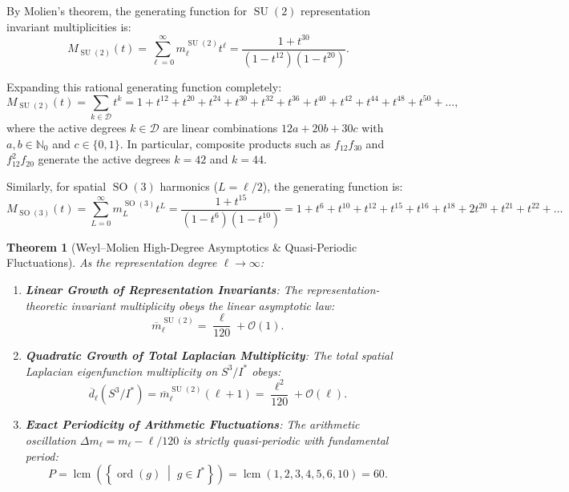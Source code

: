 \documentclass[11pt,a4paper]{article}
\newtheorem{theorem}{Theorem}[section]
\theoremstyle{definition}
\DeclareMathOperator{\lcm}{lcm}
\DeclareMathOperator{\ord}{ord}
\DeclareMathOperator{\SU}{SU}
\DeclareMathOperator{\SO}{SO}
\begin{document}
By Molien's theorem, the generating function for $\SU(2)$ representation invariant multiplicities is:
\begin{equation}
M_{\SU(2)}(t) = \sum_{\ell=0}^\infty m_\ell^{\SU(2)} t^\ell = \frac{1 + t^{30}}{(1 - t^{12})(1 - t^{20})}.
\end{equation}

Expanding this rational generating function completely:
\begin{equation}
M_{\SU(2)}(t) = \sum_{k \in \mathcal{D}} t^k = 1 + t^{12} + t^{20} + t^{24} + t^{30} + t^{32} + t^{36} + t^{40} + t^{42} + t^{44} + t^{48} + t^{50} + \dots,
\end{equation}
where the active degrees $k \in \mathcal{D}$ are linear combinations $12 a + 20 b + 30 c$ with $a, b \in \mathbb{N}_0$ and $c \in \{0, 1\}$. In particular, composite products such as $f_{12} f_{30}$ and $f_{12}^2 f_{20}$ generate the active degrees $k = 42$ and $k = 44$.

Similarly, for spatial $\SO(3)$ harmonics ($L = \ell/2$), the generating function is:
\begin{equation}
M_{\SO(3)}(t) = \sum_{L=0}^\infty m_L^{\SO(3)} t^L = \frac{1 + t^{15}}{(1 - t^6)(1 - t^{10})} = 1 + t^6 + t^{10} + t^{12} + t^{15} + t^{16} + t^{18} + 2 t^{20} + t^{21} + t^{22} + \dots
\end{equation}

\begin{theorem}[Weyl--Molien High-Degree Asymptotics \& Quasi-Periodic Fluctuations]
As the representation degree $\ell \to \infty$:
\begin{enumerate}
\item \textbf{Linear Growth of Representation Invariants}: The representation-theoretic invariant multiplicity obeys the linear asymptotic law:
\begin{equation}
\overline{m}_\ell^{\SU(2)} = \frac{\ell}{120} + \mathcal{O}(1).
\end{equation}
\item \textbf{Quadratic Growth of Total Laplacian Multiplicity}: The total spatial Laplacian eigenfunction multiplicity on $S^3 / I^*$ obeys:
\begin{equation}
\overline{d}_\ell(S^3 / I^*) = \overline{m}_\ell^{\SU(2)} (\ell + 1) = \frac{\ell^2}{120} + \mathcal{O}(\ell).
\end{equation}
\item \textbf{Exact Periodicity of Arithmetic Fluctuations}: The arithmetic oscillation $\Delta m_\ell = m_\ell - \ell/120$ is strictly quasi-periodic with fundamental period:
\begin{equation}
P = \lcm\left(\left\{ \ord(g) \;\middle|\; g \in I^* \right\}\right) = \lcm(1, 2, 3, 4, 5, 6, 10) = 60.
\end{equation}
\end{enumerate}
\end{theorem}
\end{document}
